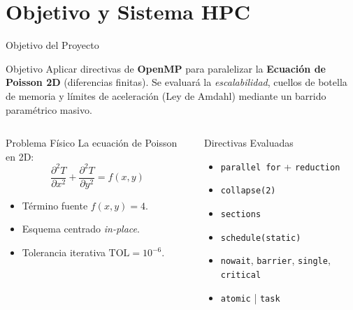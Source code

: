 \documentclass[aspectratio=169,10pt,xcolor=table]{beamer}
\begin{document}
\section{Objetivo y Sistema HPC}

\begin{frame}[shrink=5]{Objetivo del Proyecto}
  \begin{block}{Objetivo}
    Aplicar directivas de \textbf{OpenMP} para paralelizar la \textbf{Ecuación de Poisson 2D} (diferencias finitas). Se evaluará la \emph{escalabilidad}, cuellos de botella de memoria y límites de aceleración (Ley de Amdahl) mediante un barrido paramétrico masivo.
  \end{block}

  \vspace{0.1cm}
  \begin{columns}[t]
      \begin{block}{Problema Físico}
        La ecuación de Poisson en 2D:
        \vspace{-0.2cm}
        \[
          \frac{\partial^2 T}{\partial x^2}+\frac{\partial^2 T}{\partial y^2}=f(x,y)
        \]
        \vspace{-0.2cm}
        \begin{itemize}
          \item Término fuente $f(x,y)=4$.
          \item Esquema centrado \emph{in-place}.
          \item Tolerancia iterativa $\text{TOL}=10^{-6}$.
        \end{itemize}
      \end{block}
      \begin{block}{Directivas Evaluadas}
        \begin{itemize}
          \item \texttt{parallel for} + \texttt{reduction}
          \item \texttt{collapse(2)}
          \item \texttt{sections}
          \item \texttt{schedule(static)}
          \item \texttt{nowait}, \texttt{barrier}, \texttt{single}, \texttt{critical}
          \item \texttt{atomic} \quad | \quad \texttt{task}
        \end{itemize}
      \end{block}
  \end{columns}
\end{frame}
\end{document}
